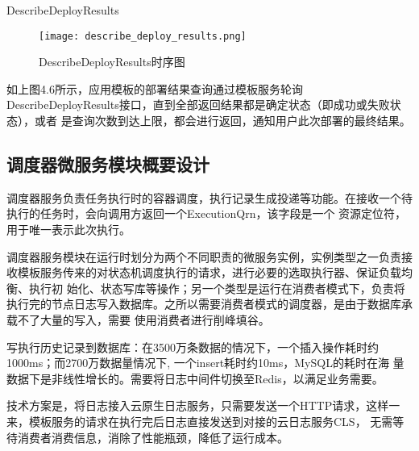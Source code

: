 DescribeDeployResults

\begin{figure}[h]
    \centering
    \texttt{[image: describe\_deploy\_results.png]}
    \caption{DescribeDeployResults时序图}
    \label{fig:DescribeDeployResults时序图}
\end{figure}
如上图4.6所示，应用模板的部署结果查询通过模板服务轮询DescribeDeployResults接口，直到全部返回结果都是确定状态（即成功或失败状态），或者
是查询次数到达上限，都会进行返回，通知用户此次部署的最终结果。

\subsection{调度器微服务模块概要设计}
调度器服务负责任务执行时的容器调度，执行记录生成投递等功能。在接收一个待执行的任务时，会向调用方返回一个ExecutionQrn，该字段是一个
资源定位符，用于唯一表示此次执行。

调度器服务模块在运行时划分为两个不同职责的微服务实例，实例类型之一负责接收模板服务传来的对状态机调度执行的请求，进行必要的选取执行器、保证负载均衡、执行初
始化、状态写库等操作；另一个类型是运行在消费者模式下，负责将执行完的节点日志写入数据库。之所以需要消费者模式的调度器，是由于数据库承载不了大量的写入，需要
使用消费者进行削峰填谷。

写执行历史记录到数据库：在3500万条数据的情况下，一个插入操作耗时约1000ms；而2700万数据量情况下, 一个insert耗时约10ms，MySQL的耗时在海
量数据下是非线性增长的。需要将日志中间件切换至Redis，以满足业务需要。

技术方案是，将日志接入云原生日志服务，只需要发送一个HTTP请求，这样一来，模板服务的请求在执行完后日志直接发送到对接的云日志服务CLS，
无需等待消费者消费信息，消除了性能瓶颈，降低了运行成本。


